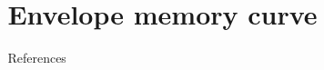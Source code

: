 \documentclass[final,hyperref={pdfpagelabels=false}]{beamer}
\begin{document}
\begin{frame}{}
\begin{columns}[t]
\begin{column}{0.32\linewidth}
\end{column}

\begin{column}{0.32\linewidth}

\section{Envelope memory curve}



\begin{block}{References}
%
 {\small
 
 
 }
%
\end{block}


\end{column}





\end{columns}

\end{frame}
\end{document}
